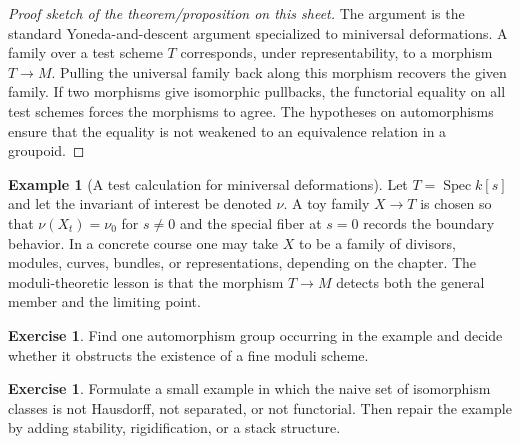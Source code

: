 \documentclass[11pt]{amsart}
\theoremstyle{definition}
\newtheorem{example}[theorem]{Example}
\newtheorem{exercise}[theorem]{Exercise}
\newcommand{\Spec}{\operatorname{Spec}}
\begin{document}
\begin{proof}[Proof sketch of the theorem/proposition on this sheet]
The argument is the standard Yoneda-and-descent argument specialized to miniversal deformations.  A family over a test scheme $T$ corresponds, under representability, to a morphism $T\to M$.  Pulling the universal family back along this morphism recovers the given family.  If two morphisms give isomorphic pullbacks, the functorial equality on all test schemes forces the morphisms to agree.  The hypotheses on automorphisms ensure that the equality is not weakened to an equivalence relation in a groupoid.
\end{proof}
\begin{example}[A test calculation for miniversal deformations]
Let $T=\Spec k[s]$ and let the invariant of interest be denoted $\nu$.  A toy family $X\to T$ is chosen so that $\nu(X_t)=\nu_0$ for $s\ne0$ and the special fiber at $s=0$ records the boundary behavior.  In a concrete course one may take $X$ to be a family of divisors, modules, curves, bundles, or representations, depending on the chapter.  The moduli-theoretic lesson is that the morphism $T\to M$ detects both the general member and the limiting point.
\end{example}
\begin{exercise}
Find one automorphism group occurring in the example and decide whether it obstructs the existence of a fine moduli scheme.
\end{exercise}
\begin{exercise}
Formulate a small example in which the naive set of isomorphism classes is not Hausdorff, not separated, or not functorial.  Then repair the example by adding stability, rigidification, or a stack structure.
\end{exercise}
\clearpage
\end{document}
